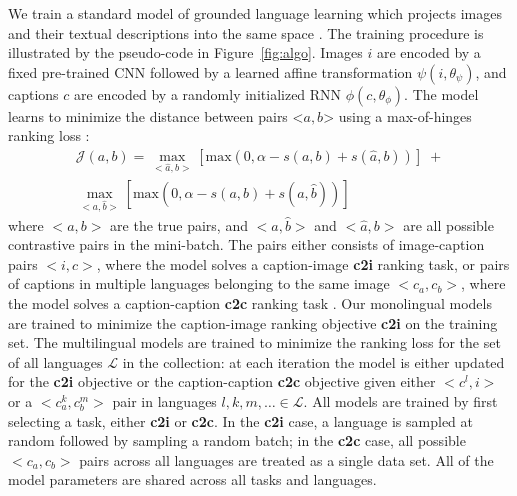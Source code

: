 We train a standard model of grounded language learning which  projects images and their textual descriptions into the same space \cite{kiros2014unifying,karpathy2015deep}.
The training procedure is illustrated by the pseudo-code in Figure~\ref{fig:algo}.
Images $i$ are encoded by a fixed pre-trained CNN followed by a learned affine transformation $\psi(i, \theta_\psi)$, and captions $c$ are encoded by a randomly initialized RNN $\phi(c, \theta_\phi)$.
The model learns to minimize the distance between pairs $\textrm{<}a,b\textrm{>}$ using a max-of-hinges ranking loss \cite{faghri2017vse++}:
%
\begin{equation*}
\begin{split}
\mathcal{J}(a, b) = \max_{<\hat{a}, b>}[\text{max}(0, \alpha - s(a,b) + s(\hat{a}, b))] \;+ \\ \max_{<a, \hat{b}>}[\text{max}(0, \alpha - s(a,b) + s(a, \hat{b}))]
\end{split}
\end{equation*}
%
where $<a, b>$ are the true pairs, and $<a, \hat{b}>$ and $<\hat{a}, b>$ are all possible contrastive pairs in the mini-batch.
The pairs either consists of image-caption pairs $<i , c>$, where the model solves a caption-image  {\bf c2i} ranking task, or pairs of
captions in multiple languages belonging to the same image $<c_a, c_b>$, where the model solves a caption-caption {\bf c2c} ranking task \cite{gella2017image}.
Our monolingual models are trained to minimize the caption-image
ranking objective {\bf c2i} on the training set.
The multilingual models are trained to minimize the ranking loss for the set of all languages $\mathcal{L}$ in the collection: at each iteration the model is either updated for the {\bf c2i} objective or the caption-caption {\bf c2c} objective given either $<c^l, i>$ or a  $<c^k_a, c^m_b>$ pair in languages $l,k,m, \ldots \in \mathcal{L}$. All models are trained by first selecting a task, either {\bf c2i} or {\bf c2c}. In the {\bf c2i} case, a language is sampled at random followed by sampling a random batch; in the {\bf c2c} case, all possible $<c_a, c_b>$ pairs across all languages are treated as a single data set. All of the model parameters are shared across all tasks and languages.


